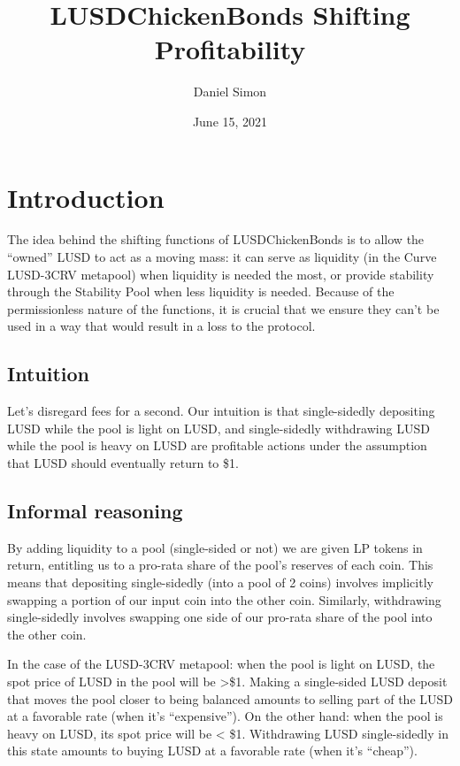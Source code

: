 \documentclass{article}
\begin{document}
\title{\textbf{LUSDChickenBonds Shifting Profitability}}
\author{Daniel Simon}
\date{June 15, 2021}

\maketitle

\section{Introduction}
The idea behind the shifting functions of LUSDChickenBonds is to allow the “owned” LUSD to act as a moving mass: it can serve as liquidity (in the Curve LUSD-3CRV metapool) when liquidity is needed the most, or provide stability through the Stability Pool when less liquidity is needed. Because of the permissionless nature of the functions, it is crucial that we ensure they can’t be used in a way that would result in a loss to the protocol.

\subsection{Intuition}
Let’s disregard fees for a second. Our intuition is that single-sidedly depositing LUSD while the pool is light on LUSD, and single-sidedly withdrawing LUSD while the pool is heavy on LUSD are profitable actions under the assumption that LUSD should eventually return to \$1.

\subsection{Informal reasoning}

By adding liquidity to a pool (single-sided or not) we are given LP tokens in return, entitling us to a pro-rata share of the pool’s reserves of each coin. This means that depositing single-sidedly (into a pool of 2 coins) involves implicitly swapping a portion of our input coin into the other coin. Similarly, withdrawing single-sidedly involves swapping one side of our pro-rata share of the pool into the other coin.

In the case of the LUSD-3CRV metapool: when the pool is light on LUSD, the spot price of LUSD in the pool will be >\$1. Making a single-sided LUSD deposit that moves the pool closer to being balanced amounts to selling part of the LUSD at a favorable rate (when it’s “expensive”). On the other hand: when the pool is heavy on LUSD, its spot price will be < \$1. Withdrawing LUSD single-sidedly in this state amounts to buying LUSD at a favorable rate (when it’s “cheap”).
\end{document}
